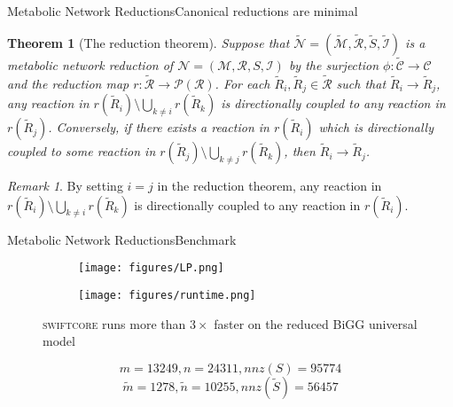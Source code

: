 \documentclass[10pt]{beamer}
\newtheorem{thm}{Theorem}[section]
\theoremstyle{remark}
\newtheorem*{rmk}{Remark}
\theoremstyle{definition}
\begin{document}
\begin{frame}{Metabolic Network Reductions}{Canonical reductions are minimal}

\begin{thm}[The reduction theorem]
Suppose that $\tilde{\mathcal{N}} = (\tilde{\mathcal{M}}, \tilde{\mathcal{R}}, \tilde{S}, 
\tilde{\mathcal{I}})$ is a metabolic network reduction of $\mathcal{N}=(\mathcal{M}, \mathcal{R}, 
S, \mathcal{I})$ by the surjection $\phi:\tilde{\mathcal{C}}\rightarrow \mathcal{C}$ 
and the reduction map $r:\tilde{\mathcal{R}}\rightarrow\mathcal{P}(\mathcal{R})$. 
For each $\tilde{R}_i,\tilde{R}_j\in\tilde{\mathcal{R}}$ such that $\tilde{R}_i \longrightarrow 
\tilde{R}_j$, any reaction in $r(\tilde{R}_i)\setminus \bigcup_{k\neq i}r(\tilde{R}_k)$ is 
directionally coupled to any reaction in $r(\tilde{R}_j)$. Conversely, if there exists a 
reaction in $r(\tilde{R}_i)$ which is directionally coupled to some reaction in $r(\tilde{R}_j)
\setminus\bigcup_{k\neq j}r(\tilde{R}_k)$, then $\tilde{R}_i \longrightarrow \tilde{R}_j$.
\end{thm}

\pause

\begin{rmk}
By setting $i=j$ in the reduction theorem, any reaction in $r(\tilde{R}_i)\setminus \bigcup_{k\neq i}r(\tilde{R}_k)$ 
is directionally coupled to any reaction in $r(\tilde{R}_i)$. 
\end{rmk}

\end{frame}

\begin{frame}{Metabolic Network Reductions}{Benchmark}
\begin{figure}[ht]
    \centering
    \begin{subfigure}[b]{0.45\textwidth}
        \texttt{[image: figures/LP.png]}
    \end{subfigure}
    \qquad
    \begin{subfigure}[b]{0.45\textwidth}
        \texttt{[image: figures/runtime.png]}
    \end{subfigure}
    \caption{\textsc{swiftcore} runs more than $3\times$ faster on the reduced BiGG universal model}
    \label{fig:BiGG}
\end{figure}
\[m=13249, n=24311, nnz(S) = 95774\]
\[\tilde{m}=1278, \tilde{n}=10255, nnz(\tilde{S}) = 56457\]
\end{frame}
\end{document}
